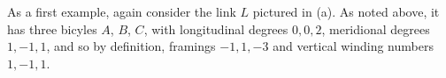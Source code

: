 As a first example, again consider the link $L$ pictured in (a).   As noted above, it has three bicyles $A$, $B$, $C$, with longitudinal degrees $0,0,2$, meridional degrees $1,-1,1$, and so by definition, framings $-1,1,-3$ and vertical winding numbers $1,-1,1$.   

